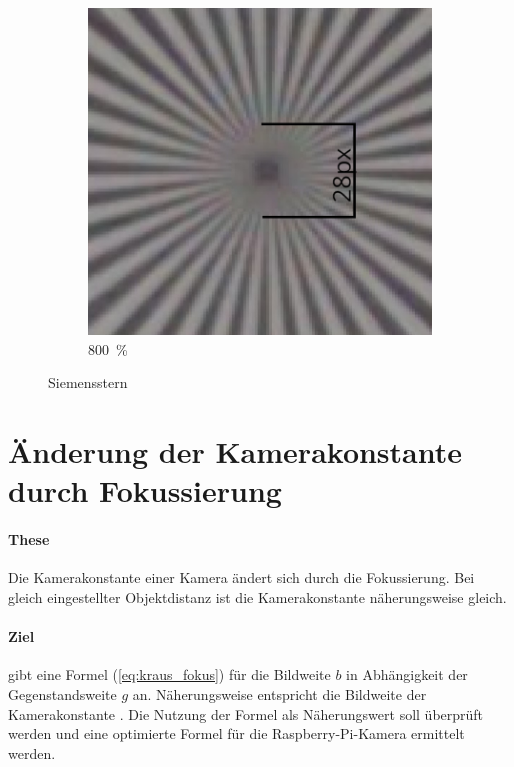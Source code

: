 \documentclass[./00PhotoBox.tex]{subfiles}
\begin{document}
\begin{figure}
\begin{subfigure}{0.45\textwidth}
        \includegraphics[height=0.9\linewidth]{./img/4_voruntersuchung/siemens_beschriftet.jpg}
        \centering
        \caption{\SI{800}{\percent}}
        \label{img:siemens_beschriftet}
    \end{subfigure}
    \caption{Siemensstern}
\end{figure}


\section{Änderung der Kamerakonstante durch Fokussierung}
\label{sec:fokus}

\paragraph{These}
Die \Gls{Kamerakonstante} einer Kamera ändert sich durch die Fokussierung. Bei gleich eingestellter Objektdistanz ist die \Gls{Kamerakonstante} näherungsweise gleich.

\paragraph{Ziel}
\citet[S. 59]{kraus} gibt eine Formel (\autoref{eq:kraus_fokus}) für die \Gls{Bildweite} $b$ in Abhängigkeit der Gegenstandsweite $g$ an. Näherungsweise entspricht die \Gls{Bildweite} der \Gls{Kamerakonstante} \citep[vgl.][S. 59]{kraus}. Die Nutzung der Formel als Näherungswert soll überprüft werden und eine optimierte Formel für die Raspberry-Pi-Kamera ermittelt werden.
\end{document}
